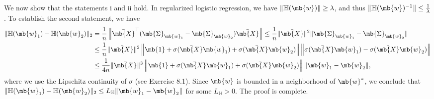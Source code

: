 \begin{exercise}
\begin{enumerate}
\begin{solution}
\begin{enumerate}
                        We now show that the statements i and ii hold. In regularized logistic regression, we have $\|\mathbb{H}(\mb{w})\| \ge \lambda$, and thus $\|\mathbb{H}(\mb{w})^{-1}\| \le \frac{1}{\lambda}$. To establish the second statement, we have
                        \begin{align*}
                            \|\mathbb{H}(\mb{w}_1) - \mathbb{H}(\mb{w}_2)\|_2 & =  \frac{1}{n} \left\|\bar{\mb{X}}^\top (\mb{\Sigma}_{\mb{w}_1} - \mb{\Sigma}_{\mb{w}_2}) \bar{\mb{X}}\right\| \le \frac{1}{n}\|\bar{\mb{X}}\|^2 \|\mb{\Sigma}_{\mb{w}_1} - \mb{\Sigma}_{\mb{w}_2}\| \\
                                                                              & \le \frac{1}{n}\|\bar{\mb{X}}\|^2 \left\|\mb{1} + \sigma(\bar{\mb{X}}\mb{w}_1) + \sigma(\bar{\mb{X}}\mb{w}_2)\right\| \left\|\sigma(\bar{\mb{X}}\mb{w}_1) - \sigma(\bar{\mb{X}}\mb{w}_2)\right\|     \\
                                                                              & \le \frac{1}{4n}\|\bar{\mb{X}}\|^3 \left\|\mb{1} + \sigma(\bar{\mb{X}}\mb{w}_1) + \sigma(\bar{\mb{X}}\mb{w}_2)\right\| \|\mb{w}_1 - \mb{w}_2\|,
                        \end{align*}
                        where we use the Lipschitz continuity of $\sigma$ (see Exercise 8.1). Since $\mb{w}$ is bounded in a neighborhood of $\mb{w}^*$, we conclude that $\|\mathbb{H}(\mb{w}_1) - \mathbb{H}(\mb{w}_2)\|_2 \le L_{\mathbb{H}} \|\mb{w}_1 - \mb{w}_2\|$ for some $L_{\mathbb{H}} > 0$. The proof is complete.
                        \qedhere
                \end{enumerate}
            \end{solution}

    \end{enumerate}


\end{exercise}
\clearpage



